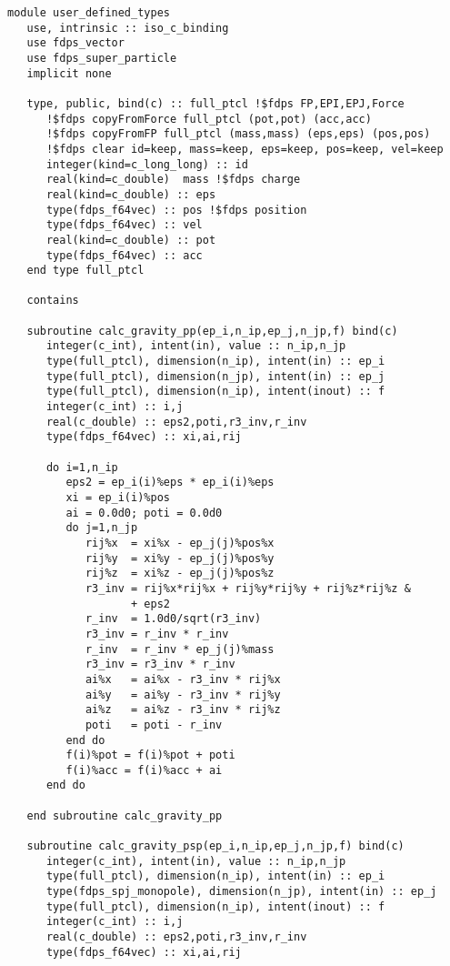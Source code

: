 \documentclass[10pt,twocolumn,a4paper,fleqn]{article}
\begin{document}

\begin{mdframed}[
    backgroundcolor=bg,
    topline=false,
    bottomline=false,
    leftline=false,
    rightline=false]
\begin{verbatim}
module user_defined_types
   use, intrinsic :: iso_c_binding
   use fdps_vector
   use fdps_super_particle
   implicit none

   type, public, bind(c) :: full_ptcl !$fdps FP,EPI,EPJ,Force
      !$fdps copyFromForce full_ptcl (pot,pot) (acc,acc)
      !$fdps copyFromFP full_ptcl (mass,mass) (eps,eps) (pos,pos) 
      !$fdps clear id=keep, mass=keep, eps=keep, pos=keep, vel=keep
      integer(kind=c_long_long) :: id
      real(kind=c_double)  mass !$fdps charge
      real(kind=c_double) :: eps
      type(fdps_f64vec) :: pos !$fdps position
      type(fdps_f64vec) :: vel
      real(kind=c_double) :: pot
      type(fdps_f64vec) :: acc
   end type full_ptcl

   contains

   subroutine calc_gravity_pp(ep_i,n_ip,ep_j,n_jp,f) bind(c)
      integer(c_int), intent(in), value :: n_ip,n_jp
      type(full_ptcl), dimension(n_ip), intent(in) :: ep_i
      type(full_ptcl), dimension(n_jp), intent(in) :: ep_j
      type(full_ptcl), dimension(n_ip), intent(inout) :: f
      integer(c_int) :: i,j
      real(c_double) :: eps2,poti,r3_inv,r_inv
      type(fdps_f64vec) :: xi,ai,rij

      do i=1,n_ip
         eps2 = ep_i(i)%eps * ep_i(i)%eps
         xi = ep_i(i)%pos
         ai = 0.0d0; poti = 0.0d0
         do j=1,n_jp
            rij%x  = xi%x - ep_j(j)%pos%x
            rij%y  = xi%y - ep_j(j)%pos%y
            rij%z  = xi%z - ep_j(j)%pos%z
            r3_inv = rij%x*rij%x + rij%y*rij%y + rij%z*rij%z &
                   + eps2
            r_inv  = 1.0d0/sqrt(r3_inv)
            r3_inv = r_inv * r_inv
            r_inv  = r_inv * ep_j(j)%mass
            r3_inv = r3_inv * r_inv
            ai%x   = ai%x - r3_inv * rij%x
            ai%y   = ai%y - r3_inv * rij%y
            ai%z   = ai%z - r3_inv * rij%z
            poti   = poti - r_inv
         end do
         f(i)%pot = f(i)%pot + poti
         f(i)%acc = f(i)%acc + ai
      end do

   end subroutine calc_gravity_pp

   subroutine calc_gravity_psp(ep_i,n_ip,ep_j,n_jp,f) bind(c)
      integer(c_int), intent(in), value :: n_ip,n_jp
      type(full_ptcl), dimension(n_ip), intent(in) :: ep_i
      type(fdps_spj_monopole), dimension(n_jp), intent(in) :: ep_j
      type(full_ptcl), dimension(n_ip), intent(inout) :: f
      integer(c_int) :: i,j
      real(c_double) :: eps2,poti,r3_inv,r_inv
      type(fdps_f64vec) :: xi,ai,rij


\end{verbatim}
\end{mdframed}
\end{document}
